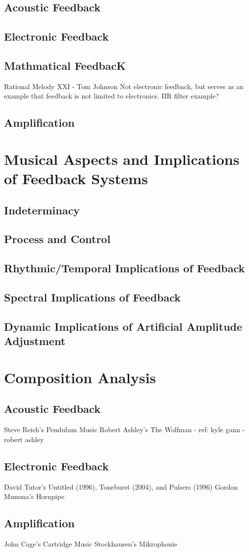 \documentclass[titlepage]{scrartcl}
\begin{document}
        \subsection{Acoustic Feedback}
        \subsection{Electronic Feedback}
        \subsection{Mathmatical FeedbacK}
        Rational Melody XXI - Tom Johnson
        Not electronic feedback, but serves as an example that feedback is not
        limited to electronics.
        IIR filter example?
        \subsection{Amplification}

    \section{Musical Aspects and Implications of Feedback Systems}
        \subsection{Indeterminacy}
        \subsection{Process and Control}
        \subsection{Rhythmic/Temporal Implications of Feedback}
        \subsection{Spectral Implications of Feedback}
        \subsection{Dynamic Implications of Artificial Amplitude Adjustment}

    \section{Composition Analysis}
        \subsection{Acoustic Feedback}
            Steve Reich's Pendulum Music
            Robert Ashley's The Wolfman - ref: kyle gann - robert ashley

        \subsection{Electronic Feedback}
            David Tutor's Untitled (1996), Toneburst (2004), and Pulsers (1996)
            Gordon Mumma's Hornpipe

        \subsection{Amplification}
            John Cage's Cartridge Music
            Stockhausen's Mikrophonie

    \printbibliography
\end{document}
